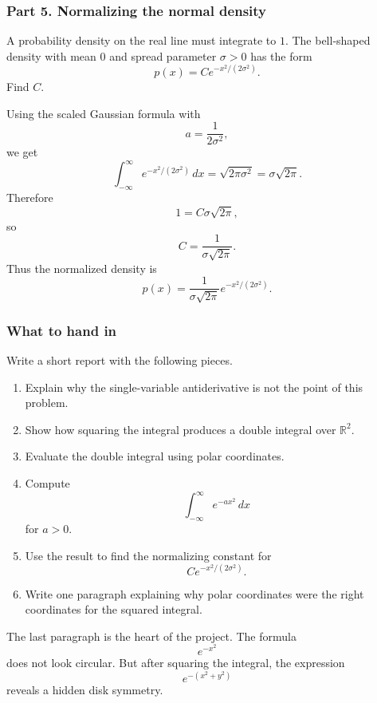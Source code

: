 \subsubsection*{Part 5. Normalizing the normal density}

A probability density on the real line must integrate to \(1\).  The bell-shaped density
with mean \(0\) and spread parameter \(\sigma>0\) has the form
\[
    p(x)=C e^{-x^2/(2\sigma^2)}.
\]
Find \(C\).

Using the scaled Gaussian formula with
\[
    a=\frac{1}{2\sigma^2},
\]
we get
\[
\int_{-\infty}^{\infty}e^{-x^2/(2\sigma^2)}\,dx
=
\sqrt{2\pi\sigma^2}
=
\sigma\sqrt{2\pi}.
\]
Therefore
\[
    1=C\sigma\sqrt{2\pi},
\]
so
\[
\boxed{
    C=\frac{1}{\sigma\sqrt{2\pi}}.
}
\]
Thus the normalized density is
\[
\boxed{
    p(x)=\frac{1}{\sigma\sqrt{2\pi}}e^{-x^2/(2\sigma^2)}.
}
\]

\subsubsection*{What to hand in}

Write a short report with the following pieces.

\begin{enumerate}
\item Explain why the single-variable antiderivative is not the point of this problem.

\item Show how squaring the integral produces a double integral over \(\mathbb R^2\).

\item Evaluate the double integral using polar coordinates.

\item Compute
\[
    \int_{-\infty}^{\infty} e^{-ax^2}\,dx
\]
for \(a>0\).

\item Use the result to find the normalizing constant for
\[
    C e^{-x^2/(2\sigma^2)}.
\]

\item Write one paragraph explaining why polar coordinates were the right coordinates for
the squared integral.
\end{enumerate}

The last paragraph is the heart of the project.  The formula
\[
    e^{-x^2}
\]
does not look circular.  But after squaring the integral, the expression
\[
    e^{-(x^2+y^2)}
\]
reveals a hidden disk symmetry.

